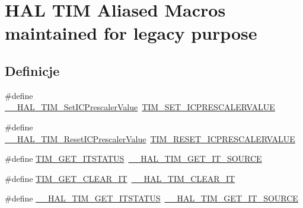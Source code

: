 \hypertarget{group___h_a_l___t_i_m___aliased___macros}{}\section{H\+AL T\+IM Aliased Macros maintained for legacy purpose}
\label{group___h_a_l___t_i_m___aliased___macros}
\subsection*{Definicje}
\begin{DoxyCompactItemize}
\item 
\#define \hyperlink{group___h_a_l___t_i_m___aliased___macros_ga1f487f25516b3fd87b864f5be8229b7e}{\+\_\+\+\_\+\+H\+A\+L\+\_\+\+T\+I\+M\+\_\+\+Set\+I\+C\+Prescaler\+Value}~\hyperlink{group___t_i_m___private___macros_ga99724157918ca8b4d8babee1d8008dcb}{T\+I\+M\+\_\+\+S\+E\+T\+\_\+\+I\+C\+P\+R\+E\+S\+C\+A\+L\+E\+R\+V\+A\+L\+UE}
\item 
\#define \hyperlink{group___h_a_l___t_i_m___aliased___macros_gac171a25ce55eafe62671d40d7397d721}{\+\_\+\+\_\+\+H\+A\+L\+\_\+\+T\+I\+M\+\_\+\+Reset\+I\+C\+Prescaler\+Value}~\hyperlink{group___t_i_m___private___macros_ga18ded32faf42c8981c8d2970bb02e126}{T\+I\+M\+\_\+\+R\+E\+S\+E\+T\+\_\+\+I\+C\+P\+R\+E\+S\+C\+A\+L\+E\+R\+V\+A\+L\+UE}
\item 
\#define \hyperlink{group___h_a_l___t_i_m___aliased___macros_ga1dd7eae80b853d3526091193e81b4731}{T\+I\+M\+\_\+\+G\+E\+T\+\_\+\+I\+T\+S\+T\+A\+T\+US}~\hyperlink{group___t_i_m___exported___macros_ga644babf93470a6eee6bce8906c4da5c5}{\+\_\+\+\_\+\+H\+A\+L\+\_\+\+T\+I\+M\+\_\+\+G\+E\+T\+\_\+\+I\+T\+\_\+\+S\+O\+U\+R\+CE}
\item 
\#define \hyperlink{group___h_a_l___t_i_m___aliased___macros_gadd580b2357a85c03653006349721a36e}{T\+I\+M\+\_\+\+G\+E\+T\+\_\+\+C\+L\+E\+A\+R\+\_\+\+IT}~\hyperlink{group___t_i_m___exported___macros_gaea68155ce77e591e0c2582def061d6f0}{\+\_\+\+\_\+\+H\+A\+L\+\_\+\+T\+I\+M\+\_\+\+C\+L\+E\+A\+R\+\_\+\+IT}
\item 
\#define \hyperlink{group___h_a_l___t_i_m___aliased___macros_ga5b35f7cd15ac31c7b1a9596ac8521f36}{\+\_\+\+\_\+\+H\+A\+L\+\_\+\+T\+I\+M\+\_\+\+G\+E\+T\+\_\+\+I\+T\+S\+T\+A\+T\+US}~\hyperlink{group___t_i_m___exported___macros_ga644babf93470a6eee6bce8906c4da5c5}{\+\_\+\+\_\+\+H\+A\+L\+\_\+\+T\+I\+M\+\_\+\+G\+E\+T\+\_\+\+I\+T\+\_\+\+S\+O\+U\+R\+CE}
\item 

\end{DoxyCompactItemize}
